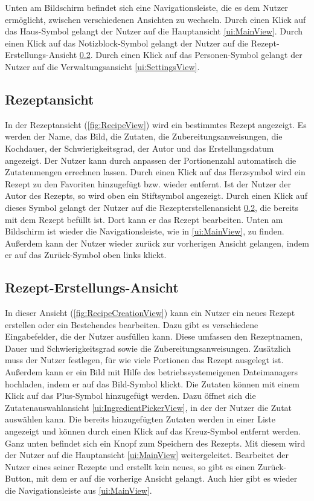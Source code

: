 \documentclass[parskip=full]{scrartcl}
\begin{document}
Unten am Bildschirm befindet sich eine Navigationsleiste, die es dem Nutzer ermöglicht, zwischen verschiedenen Ansichten zu wechseln. Durch einen Klick auf das Haus-Symbol gelangt der Nutzer auf die Hauptansicht \ref{ui:MainView}. Durch einen Klick auf das Notizblock-Symbol gelangt der Nutzer auf die Rezept-Erstellungs-Ansicht \ref{ui:RecipeCreationView}. Durch einen Klick auf das Personen-Symbol gelangt der Nutzer auf die Verwaltungsansicht \ref{ui:SettingsView}.

\subsection{Rezeptansicht}
\label{ui:RecipeView}
In der Rezeptansicht (\autoref{fig:RecipeView}) wird ein bestimmtes Rezept angezeigt. Es werden der Name, das Bild, die Zutaten, die Zubereitungsanweisungen, die Kochdauer, der Schwierigkeitsgrad, der Autor und das Erstellungsdatum angezeigt. Der Nutzer kann durch anpassen der Portionenzahl automatisch die Zutatenmengen errechnen lassen. Durch einen Klick auf das Herzsymbol wird ein Rezept zu den Favoriten hinzugefügt bzw. wieder entfernt. Ist der Nutzer der Autor des Rezepts, so wird oben ein Stiftsymbol angezeigt. Durch einen Klick auf dieses Symbol gelangt der Nutzer auf die Rezepterstellenansicht \ref{ui:RecipeCreationView}, die bereits mit dem Rezept befüllt ist. Dort kann er das Rezept bearbeiten. Unten am Bildschirm ist wieder die Navigationsleiste, wie in \ref{ui:MainView}, zu finden. Außerdem kann der Nutzer wieder zurück zur vorherigen Ansicht gelangen, indem er auf das Zurück-Symbol oben links klickt.

\subsection{Rezept-Erstellungs-Ansicht}
\label{ui:RecipeCreationView}
In dieser Ansicht (\autoref{fig:RecipeCreationView}) kann ein Nutzer ein neues Rezept erstellen oder ein Bestehendes bearbeiten. Dazu gibt es verschiedene Eingabefelder, die der Nutzer ausfüllen kann. Diese umfassen den Rezeptnamen, Dauer und Schwierigkeitsgrad sowie die Zubereitungsanweisungen. Zusätzlich muss der Nutzer festlegen, für wie viele Portionen das Rezept ausgelegt ist. Außerdem kann er ein Bild mit Hilfe des betriebssystemeigenen Dateimanagers hochladen, indem er auf das Bild-Symbol klickt. 
Die Zutaten können mit einem Klick auf das Plus-Symbol hinzugefügt werden. Dazu öffnet sich die Zutatenauswahlansicht \ref{ui:IngredientPickerView}, in der der Nutzer die Zutat auswählen kann. Die bereits hinzugefügten Zutaten werden in einer Liste angezeigt und können durch einen Klick auf das Kreuz-Symbol entfernt werden. Ganz unten befindet sich ein Knopf zum Speichern des Rezepts. Mit diesem wird der Nutzer auf die Hauptansicht \ref{ui:MainView} weitergeleitet. Bearbeitet der Nutzer eines seiner Rezepte und erstellt kein neues, so gibt es einen Zurück-Button, mit dem er auf die vorherige Ansicht gelangt. Auch hier gibt es wieder die Navigationsleiste aus \ref{ui:MainView}.
\end{document}
